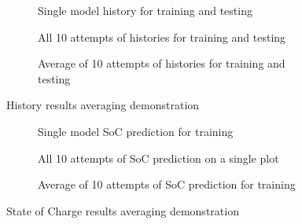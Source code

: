 \begin{figure*}[htbp]
  \centering
  \begin{subfigure}[b]{0.325\textwidth}
      \centering
      
      \caption{Single model history for training and testing}
      \label{subfig:Model-DEMO-1}
  \end{subfigure}
  \hfill
  \begin{subfigure}[b]{0.325\textwidth}
      \centering
      
      \caption{All 10 attempts of histories for training and testing}
      \label{subfig:Model-DEMO-10}
  \end{subfigure}
  \hfill
  \begin{subfigure}[b]{0.325\textwidth}
      \centering
      
      \caption{Average of 10 attempts of histories for training and testing}
      \label{subfig:Model-DEMO-avr}
  \end{subfigure}
  \caption{History results averaging demonstration}
  \label{fig:Model-DEMO}
\end{figure*}
\begin{figure*}[htbp]
  \centering
  \begin{subfigure}[b]{0.325\textwidth}
      \centering
      
      \caption{Single model SoC prediction for training \ \ \ \ \ }
      \label{subfig:Model-DEMO2-1}
  \end{subfigure}
  \hfill
  \begin{subfigure}[b]{0.325\textwidth}
      \centering
      
      \caption{All 10 attempts of SoC prediction on a single plot}
      \label{subfig:Model-DEMO2-10}
  \end{subfigure}
  \hfill
  \begin{subfigure}[b]{0.325\textwidth}
      \centering
      
      \caption{Average of 10 attempts of SoC prediction for training}
      \label{subfig:Model-DEMO2-avr}
  \end{subfigure}
  \caption{State of Charge results averaging demonstration}
  \label{fig:Model-DEMO2}
\end{figure*}

